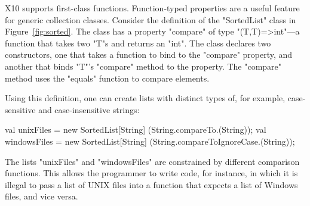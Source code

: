 X10 supports first-class functions.
Function-typed properties are a useful feature for generic
collection classes.  Consider the definition of the
\xcd"SortedList" class in Figure~\ref{fig:sorted}.
The class has a property \xcd"compare" of type
\xcd"(T,T)=>int"---a function that takes two \xcd"T"s and
returns an \xcd"int".  The class declares two constructors,
one that takes a function to bind to the \xcd"compare"
property, and another that binds \xcd"T"'s \xcd"compare" method to
the property.  The \xcd"compare" method uses the \xcd"equals"
function to compare elements. 

Using this definition, one can create lists with distinct types
of, for example, case-sensitive and case-insensitive strings:
{\footnotesize\begin{xten}
val unixFiles
  = new SortedList[String]
        (String.compareTo.(String));
val windowsFiles
  = new SortedList[String]
        (String.compareToIgnoreCase.(String));
\end{xten}}

\noindent
The lists \xcd"unixFiles" and \xcd"windowsFiles" are constrained
by different comparison functions.  This allows the programmer
to write code, for instance, in which it is illegal to pass a list of UNIX
files into a function that expects a list of Windows files, and
vice versa.
